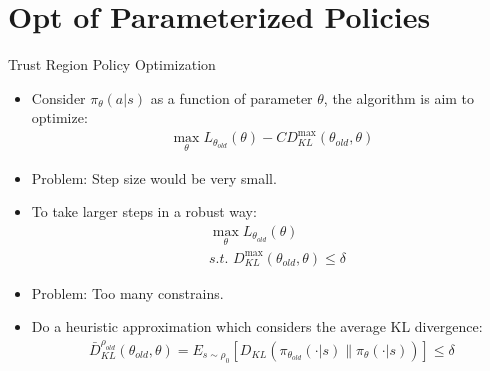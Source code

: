 \documentclass[mathserif]{beamer}
\begin{document}
\section{Opt of Parameterized Policies}
\begin{frame}[t]{Trust Region Policy Optimization}
  \begin{itemize}
    \item Consider $\pi_{\theta}(a|s)$ as a function of parameter $\theta$, the algorithm is aim to optimize:
    \begin{align}
      \max_{\theta} L_{\theta_{old}}(\theta)-CD_{KL}^{\max}(\theta_{old},\theta)
    \end{align}
    \item Problem: Step size would be very small.
    \item To take larger steps in a robust way:
    \begin{align}
      &\max_{\theta}L_{\theta_{old}}(\theta)\\
      &s.t. \hspace{4pt}D_{KL}^{\max}(\theta_{old},\theta)\le\delta
    \end{align}
    \item Problem: Too many constrains.
    \item Do a heuristic approximation which considers the average KL divergence:
    \begin{align}
      \bar{D}_{KL}^{\rho_{old}}(\theta_{old},\theta)=E_{s\sim\rho_{0}}[D_{KL}(\pi_{\theta_{old}}(\cdot|s)\parallel\pi_{\theta}(\cdot|s))]\le\delta
    \end{align}
  \end{itemize}
\end{frame}
\end{document}
